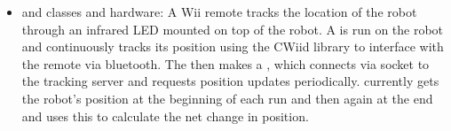 \begin{itemize}
\item {} and  classes and
  hardware: A Wii remote tracks the location of the robot through an
  infrared LED mounted on top of the robot. A  is
  run on the robot and continuously tracks its position using the
  CWiid library\cite{cwiid} to interface with the remote via
  bluetooth.  The  then makes a
  , which connects via socket to the tracking
  server and requests position updates periodically.
   currently gets the robot's position at the
  beginning of each run and then again at the end and uses this to
  calculate the net change in position.

\end{itemize}
